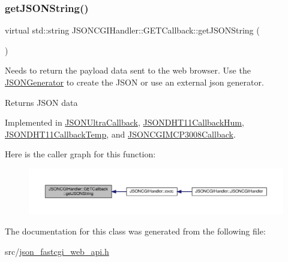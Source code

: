 \subsubsection{\texorpdfstring{get\+J\+S\+O\+N\+String()}{getJSONString()}}
{\footnotesize\ttfamily virtual std\+::string J\+S\+O\+N\+C\+G\+I\+Handler\+::\+G\+E\+T\+Callback\+::get\+J\+S\+O\+N\+String (\begin{DoxyParamCaption}{ }\end{DoxyParamCaption})\hspace{0.3cm}{\ttfamily [pure virtual]}}

Needs to return the payload data sent to the web browser. Use the \hyperlink{classJSONCGIHandler_1_1JSONGenerator}{J\+S\+O\+N\+Generator} to create the J\+S\+ON or use an external json generator. \begin{DoxyReturn}{Returns}
J\+S\+ON data 
\end{DoxyReturn}


Implemented in \hyperlink{classJSONUltraCallback_abb097f82255b74c56370b90bc06d81da}{J\+S\+O\+N\+Ultra\+Callback}, \hyperlink{classJSONDHT11CallbackHum_acc4cc41772967e063e1364d7c92ab985}{J\+S\+O\+N\+D\+H\+T11\+Callback\+Hum}, \hyperlink{classJSONDHT11CallbackTemp_afe3fed3115bf659bdeb92463c7965dac}{J\+S\+O\+N\+D\+H\+T11\+Callback\+Temp}, and \hyperlink{classJSONCGIMCP3008Callback_aac6e6543d0b4da62f72781f3fe47ebed}{J\+S\+O\+N\+C\+G\+I\+M\+C\+P3008\+Callback}.

Here is the caller graph for this function\+:
\nopagebreak
\begin{figure}[H]
\begin{center}
\leavevmode
\includegraphics[width=350pt]{classJSONCGIHandler_1_1GETCallback_a2367bf5a5912e9e5599ee464e0846255_icgraph}
\end{center}
\end{figure}


The documentation for this class was generated from the following file\+:\begin{DoxyCompactItemize}
\item 
src/\hyperlink{json__fastcgi__web__api_8h}{json\+\_\+fastcgi\+\_\+web\+\_\+api.\+h}\end{DoxyCompactItemize}
